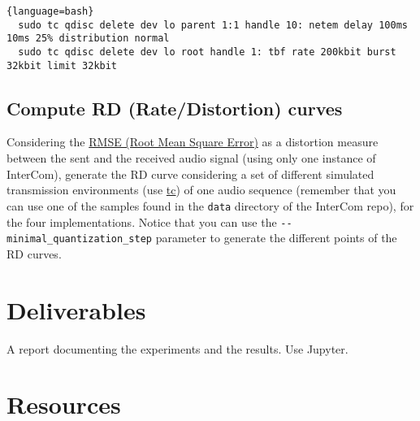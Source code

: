 \begin{lstlisting}{language=bash}
  sudo tc qdisc delete dev lo parent 1:1 handle 10: netem delay 100ms 10ms 25% distribution normal
  sudo tc qdisc delete dev lo root handle 1: tbf rate 200kbit burst 32kbit limit 32kbit
\end{lstlisting}

\subsection{Compute RD (Rate/Distortion) curves}
Considering the
\href{https://en.wikipedia.org/wiki/Root-mean-square_deviation}{RMSE
  (Root Mean Square Error)} as a distortion measure between the sent and
the received audio signal (using only one instance of InterCom),
generate the RD curve considering a set of different simulated
transmission environments (use
\href{https://man7.org/linux/man-pages/man8/tc.8.html}{tc}) of one
audio sequence (remember that you can use one of the samples found in
the \verb|data| directory of the InterCom repo), for the four
implementations. Notice that you can use the
\verb|--minimal_quantization_step| parameter to generate the different
points of the RD curves.


\section{Deliverables}

A report documenting the experiments and the results. Use Jupyter.

\section{Resources}


